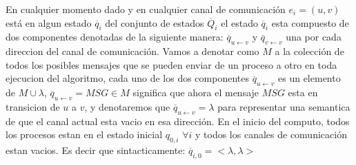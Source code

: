 \documentclass[10pt]{report}
\begin{document}
    En cualquier momento dado y en cualquier canal de comunicación $e_{i}=(u,v)$ está en algun estado
    $\overline{q}_{i}$ del conjunto de estados $\overline{Q}_{i}$
    el estado $\overline{q}_{i}$ esta compuesto de dos componentes denotadas de la siguiente manera:
    $\overline{q}_{u\leftarrow v}$ y $\overline{q}_{v\leftarrow v}$ una por cada direccion del canal
    de comunicación.
    Vamos a denotar como $M$ a la colección de todos los posibles mensajes que se pueden enviar de un proceso a otro en toda ejecucion del algoritmo,
    \space cada uno de los dos componentes $\overline{q}_{u \leftarrow v}$ es un elemento de $M \cup \lambda$,
    $\overline{q}_{u\leftarrow v} = MSG\in M$ significa que ahora el mensaje $MSG$ esta en transicion de
    $u$ a $v$, y denotaremos que $\overline{q}_{u\leftarrow v} = \lambda$ para representar una semantica de que
    el canal actual esta vacio en esa dirección.
    En el inicio del computo, todos los procesos estan en el estado inicial $q_{0,i}$ $\forall i$
    y todos los canales de comunicación estan vacios.
    Es decir que sintacticamente: $\overline{q}_{i,0} = <\lambda,\lambda>$
    \newline
\end{document}
